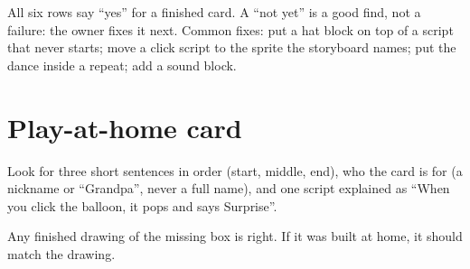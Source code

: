 \begin{answer}
All six rows say \enquote{yes} for a finished card. A \enquote{not yet} is a good find, not a failure: the owner fixes it next. Common fixes: put a hat block on top of a script that never starts; move a click script to the sprite the storyboard names; put the dance inside a repeat; add a sound block.
\end{answer}

\section{Play-at-home card}
\begin{answer}
Look for three short sentences in order (start, middle, end), who the card is for (a nickname or \enquote{Grandpa}, never a full name), and one script explained as \enquote{When you click the balloon, it pops and says Surprise}.
\end{answer}

\begin{answer}
Any finished drawing of the missing box is right. If it was built at home, it should match the drawing.
\end{answer}
